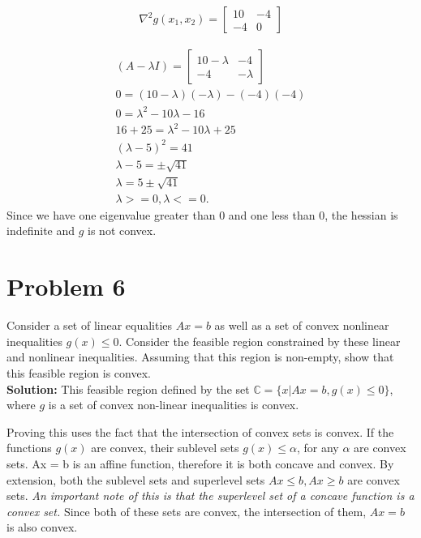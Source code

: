 \documentclass[11pt]{article}
\begin{document}
\begin{align*}
  \nabla^2 g(x_1, x_2) = 
  \begin{bmatrix}
    10  & -4 \\
    -4 & 0
  \end{bmatrix}
\end{align*}

\begin{align*}
  (A - \lambda I) = 
  \begin{bmatrix}
    10 - \lambda  & -4 \\
    -4 & - \lambda
  \end{bmatrix}
  \\
  0 = (10- \lambda)(-\lambda) - (-4)(-4) \\
  0 = \lambda^2 - 10 \lambda - 16  \\
  16 + 25 = \lambda^2 - 10 \lambda + 25 \\
  (\lambda - 5)^2 = 41 \\
  \lambda - 5 = \pm \sqrt{41} \\
  \lambda = 5 \pm \sqrt{41} \\
  \lambda >= 0, \lambda <=0.
\end{align*}
Since we have one eigenvalue greater than 0 and one less than 0, the hessian is indefinite and $g$ is not convex.

\section{Problem 6}
Consider a set of linear equalities $Ax = b$ as well as a set of convex nonlinear inequalities $g(x) \leq 0$. 
Consider the feasible region constrained by these linear and nonlinear inequalities.
Assuming that this region is non-empty, show that this feasible region is convex.
\\
\textbf{Solution: }
This feasible region defined by the set $\mathbb{C} = \{ x | Ax = b, g(x) \leq 0 \}$, where $g$ is a set of convex non-linear inequalities is convex.

Proving this uses the fact that the intersection of convex sets is convex.
If the functions $g(x)$ are convex, their sublevel sets $g(x) \leq \alpha$, for any $\alpha$ are convex sets.
Ax = b is an affine function, therefore it is both concave and convex. 
By extension, both the sublevel sets and superlevel sets $Ax \leq b, Ax \geq b$ are convex sets.
\textit{An important note of this is that the superlevel set of a concave function is a convex set.}
Since both of these sets are convex, the intersection of them, $Ax = b$ is also convex.
\end{document}
